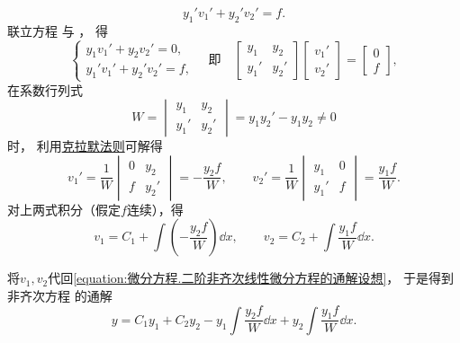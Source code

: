 \begin{enumerate}
	\begin{equation}\label{equation:微分方程.二阶非齐次线性微分方程的额外条件2}
		y_1' v_1' + y_2' v_2' = f.
	\end{equation}
	联立方程 
	与 ，
	得\begin{equation*}
		\left\{ \begin{array}{l}
			y_1 v_1' + y_2 v_2' = 0, \\
			y_1' v_1' + y_2' v_2' = f,
		\end{array} \right.
		\quad\text{即}\quad
		\begin{bmatrix}
			y_1 & y_2 \\
			y_1' & y_2'
		\end{bmatrix}
		\begin{bmatrix}
			v_1' \\ v_2'
		\end{bmatrix}
		= \begin{bmatrix}
			0 \\ f
		\end{bmatrix},
	\end{equation*}
	在系数行列式\begin{equation*}
		W = \begin{vmatrix} y_1 & y_2 \\ y_1' & y_2' \end{vmatrix}
		= y_1 y_2' - y_1 y_2 \neq0
	\end{equation*}时，
	利用\hyperref[theorem:线性方程组.克拉默法则]{克拉默法则}可解得\begin{equation*}
		v_1'
		= \frac1W \begin{vmatrix}
			0 & y_2 \\
			f & y_2'
		\end{vmatrix}
		= -\frac{y_2 f}{W},
		\qquad
		v_2'
		= \frac1W \begin{vmatrix}
			y_1 & 0 \\
			y_1' & f
		\end{vmatrix}
		= \frac{y_1 f}{W}.
	\end{equation*}
	对上两式积分（假定\(f\)连续），得\begin{equation*}
		v_1 = C_1 + \int \left(-\frac{y_2 f}{W}\right) \dd{x},
		\qquad
		v_2 = C_2 + \int \frac{y_1 f}{W} \dd{x}.
	\end{equation*}

	将\(v_1,v_2\)代回\cref{equation:微分方程.二阶非齐次线性微分方程的通解设想}，
	于是得到非齐次方程  的通解
	\begin{equation}\label{equation:微分方程.二阶非齐次线性微分方程的通解.形式1}
		y = C_1 y_1 + C_2 y_2
		- y_1 \int \frac{y_2 f}{W} \dd{x}
		+ y_2 \int \frac{y_1 f}{W} \dd{x}.
	\end{equation}


\end{enumerate}
